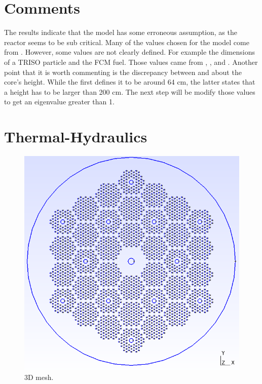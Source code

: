 \documentclass[11pt,letterpaper]{article}
\begin{document}
\section{Comments}

The results indicate that the model has some erroneous assumption, as the reactor seems to be sub critical.
Many of the values chosen for the model come from \cite{hawari_development_2018}. However, some values are not clearly defined.
For example the dimensions of a TRISO particle and the FCM fuel. Those values came from \cite{powers_fully_2013}, \cite{jo_preliminary_2014}, and \cite{venneri_neutronic_2015}.
Another point that it is worth commenting is the discrepancy between \cite{hawari_development_2018} and \cite{jo_preliminary_2014} about the core's height. While the first defines it to be around 64 cm, the latter states that a height has to be larger than 200 cm.
The next step will be modify those values to get an eigenvalue greater than 1.

\section{Thermal-Hydraulics}

\begin{figure}[H]
	\centering
	\includegraphics[width=0.5\linewidth]{figures/MMR3D_full.png}
	\hfill
	\caption{3D mesh.}
	\label{fig:gmsh3D}
\end{figure}



\pagebreak


\end{document}
